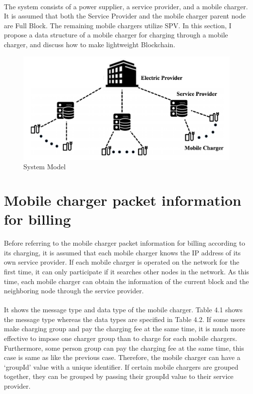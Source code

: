 \paragraph{}
The system consists of a
power supplier, a service provider, and a mobile charger. It is
assumed that both the Service Provider and the mobile charger
parent node are Full Block. The remaining mobile chargers
utilize SPV. In this section, I propose a data structure of a
mobile charger for charging through a mobile charger, and
discuss how to make lightweight Blockchain.

\begin{figure}[H]
	\centering
	\includegraphics[scale=0.3]{system_model.png}
	\caption{System Model}
\end{figure}

\section{Mobile charger packet information for billing}

\paragraph{}
Before referring to the mobile charger packet information
for billing according to its charging, it is assumed that each
mobile charger knows the IP address of its own service
provider. If each mobile charger is operated on the network
for the first time, it can only participate if it searches other
nodes in the network. As this time, each mobile charger can
obtain the information of the current block and the
neighboring node through the service provider.

\paragraph{}
It shows the message type and data type of the mobile
charger. Table 4.1 shows the message type whereas the data
types are specified in Table 4.2. If some users make charging
group and pay the charging fee at the same time, it is much
more effective to impose one charger group than to charge for
each mobile chargers. Furthermore, some person group can
pay the charging fee at the same time, this case is same as like
the previous case. Therefore, the mobile charger can have a
‘groupId’ value with a unique identifier. If certain mobile
chargers are grouped together, they can be grouped by passing
their groupId value to their service provider.

